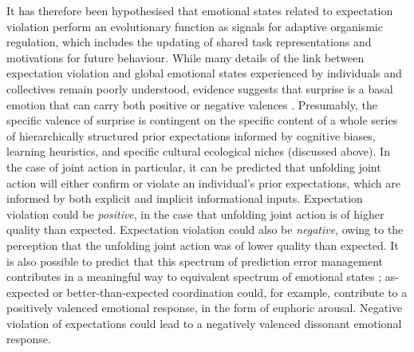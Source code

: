 \begin{CJK}{UTF8}{gbsn}
{It has therefore been hypothesised that emotional states related to expectation violation perform an evolutionary function as signals for adaptive organismic regulation, which includes the updating of shared task representations and motivations for future behaviour\citep{Cosmides2000,Barrett2017}.  While many details of the link between expectation violation and global emotional states experienced by individuals and collectives remain poorly understood, evidence suggests that surprise is a basal emotion that can carry both positive or negative valences \citep{Ortony1990}. Presumably, the specific valence of surprise is contingent on the specific content of a whole series of hierarchically structured prior expectations informed by cognitive biases, learning heuristics, and specific cultural ecological niches (discussed above).  In the case of joint action in particular, it can be predicted that unfolding joint action will either confirm or violate an individual's prior expectations, which are informed by both explicit and implicit informational inputs.
Expectation violation could be \textit{positive}, in the case that unfolding joint action is of higher quality than expected.  Expectation violation could also be \textit{negative}, owing to the perception that the unfolding joint action was of lower quality than expected.  It is also possible to predict that this spectrum of prediction error management contributes in a meaningful way to equivalent spectrum of emotional states \citep{Pessoa2014};  as-expected or better-than-expected coordination could, for example, contribute to a positively valenced emotional response, in the form of euphoric arousal.  Negative violation of expectations could lead to a negatively valenced dissonant emotional response.


}
\end{CJK}
